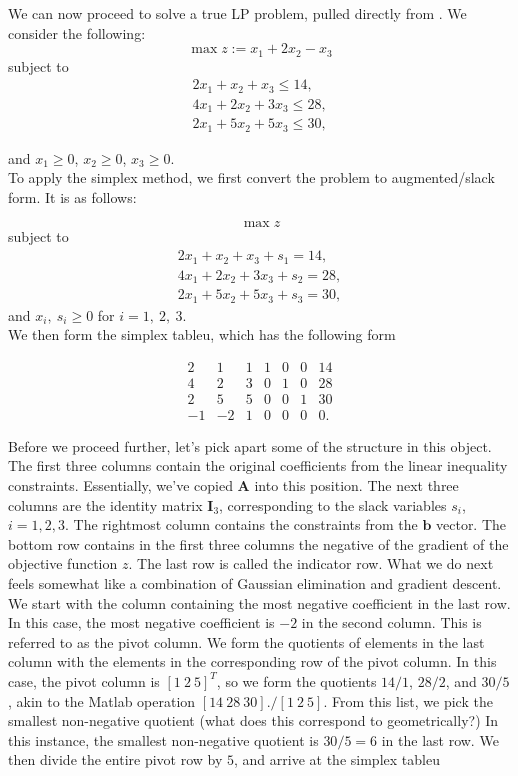 \documentclass[12pt,english]{article}
\begin{document}
We can now proceed to solve a true LP problem, pulled directly from \cite{}.  We consider the following:
$$
\max z := x_1 +2 x_2 - x_3
$$
subject to
$$
\begin{array}{c}
2 x_1 + x_2 + x_3 \leq 14, \\
4 x_1 + 2 x_2 + 3 x_3 \leq 28, \\
2 x_1 + 5 x_2 + 5 x_3 \leq 30,
\end{array}
$$

and $x_1 \geq 0$, $x_2 \geq 0$, $x_3 \geq 0$. \\

To apply the simplex method, we first convert the problem to augmented/slack form.  It is as follows:

$$
\max z
$$
subject to 
$$
\begin{array}{c}
2 x_1 + x_2 + x_3 + s_1 = 14, \\
4 x_1 + 2 x_2 + 3 x_3 + s_2 = 28, \\
2 x_1 + 5 x_2 + 5 x_3 + s_3 = 30,
\end{array}
$$
and $x_i, ~ s_i \geq 0$ for $i=1, ~2, ~3.$ \\

We then form the simplex tableu, which has the following form

\begin{equation}\label{eq:1.3}
\begin{array}{cccccc|c}
2 	&	1	& 	1 	& 	1	& 	0	&	0	&	14 \\
4	&	2	& 	3	&	0	&	1	&	0	&	28 \\
2	&	5	&	5	&	0	&	0	& 	1	& 	30 \\
\hline
-1	& 	-2	&	1	& 	0	&	0	&	0	&	0.
\end{array}
\end{equation}

Before we proceed further, let's pick apart some of the structure in this object.  The first three columns contain the original coefficients from the linear inequality constraints.  Essentially, we've copied $\mathbf{A}$ into this position.  The next three columns are the identity matrix $\mathbf{I}_3$, corresponding to the slack variables $s_i$, $i=1, 2, 3.$  The rightmost column contains the constraints from the $\mathbf{b}$ vector.  The bottom row contains in the first three columns the negative of the gradient of the objective function $z$.  The last row is called the indicator row.   What we do next feels somewhat like a combination of Gaussian elimination and gradient descent.  We start with the column containing the most negative coefficient in the last row.  In this case, the most negative coefficient is $-2$ in the second column.  This is referred to as the pivot column.   We form the quotients of elements in the last column with the elements in the corresponding row of the pivot column.  In this case, the pivot column is $[1 ~2 ~5]^T$, so we form the quotients $14/1$, $28/2$, and $30/5$, akin to the Matlab operation $[14 ~28 ~30]./[1 ~2 ~5]$.  From this list, we pick the smallest non-negative quotient (what does this correspond to geometrically?)  In this instance, the smallest non-negative quotient is $30/5 = 6$ in the last row.   We then divide the entire pivot row by $5$, and arrive at the simplex tableu
\end{document}
